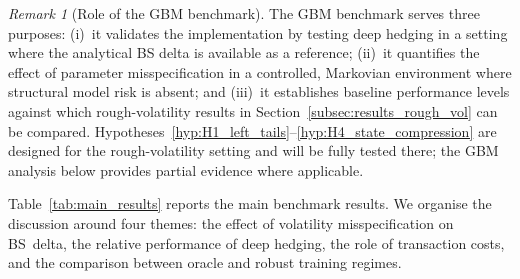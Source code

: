 \documentclass[12pt,a4paper]{article}
\theoremstyle{definition}
\theoremstyle{plain}
\theoremstyle{remark}
\newtheorem{remark}{Remark}[section]
\theoremstyle{plain}
\begin{document}
\begin{remark}[Role of the GBM benchmark]
\label{rem:gbm_benchmark_role}
The GBM benchmark serves three purposes: (i)~it validates the
implementation by testing deep hedging in a setting where the
analytical BS delta is available as a reference;
(ii)~it quantifies the effect of parameter misspecification
in a controlled, Markovian environment where structural
model risk is absent; and (iii)~it establishes baseline
performance levels against which rough-volatility results
in Section~\ref{subsec:results_rough_vol} can be compared.
Hypotheses~\ref{hyp:H1_left_tails}--\ref{hyp:H4_state_compression}
are designed for the rough-volatility setting and will be fully
tested there; the GBM analysis below provides partial evidence
where applicable.
\end{remark}

Table~\ref{tab:main_results} reports the main benchmark results.
We organise the discussion around four themes:
the effect of volatility misspecification on BS~delta,
the relative performance of deep hedging,
the role of transaction costs,
and the comparison between oracle and robust training regimes.
 
\end{document}
